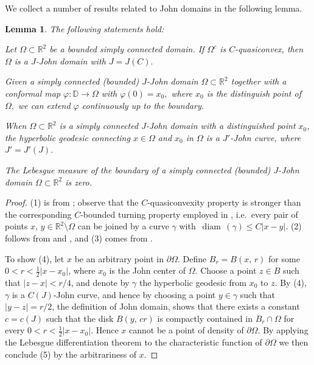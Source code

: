 \documentclass[reqno,11pt]{amsart}
\makeatletter
\def\diam{{\mathop\mathrm{\,diam\,}}}
\newtheorem{lem}[thm]{Lemma}%
\numberwithin{equation}{section}
\theoremstyle{remark}
\makeatother
\begin{document}
We collect a number of results related to John domains in the following lemma. 
\begin{lem}\label{property of John domain}
The following statements hold: 

Let $\Omega\subset \mathbb R^2$ be a bounded simply connected domain. 
If $\Omega^c$ is $C$-quasiconvex, then $\Omega$ is a $J$-John domain
with $J=J(C).$ 

Given a simply connected (bounded) $J$-John domain 
$\Omega\subset \mathbb R^2$ together with a conformal map 
$\varphi \colon \mathbb D \to \Omega$ with $\varphi(0)=x_0,$  where $x_0$ is 
the distinguish point of $\Omega,$ we can 
extend $\varphi$ 
continuously up to the boundary. 

 When $\Omega\subset \mathbb R^2$ is a simply connected $J$-John domain with a distinguished point $x_0$,  the hyperbolic geodesic connecting $x\in \Omega$ and $x_0$ in $\Omega$
is a $J'$-John curve, where $J'=J'(J).$

The Lebesgue measure of the boundary of a simply connected (bounded) $J$-John domain 
$\Omega\subset \mathbb R^2$ is zero. 
\end{lem}
\begin{proof}
(1) is from \cite[Theorem 4.5]{NV1991}; observe that the $C$-quasiconvexity property is  stronger  than the corresponding $C$-bounded turning property employed in \cite[Theorem 4.5]{NV1991}, i.e.\ every pair of points $x,\,y\in \mathbb R^2\setminus \Omega$ can be joined by a curve $\gamma$ with $\diam(\gamma)\le C |x-y|$. (2) follows from \cite[Theorem 2.18]{NV1991} and \cite[Theorem 4.7,\,Page 441]{P1991}, and (3) comes from \cite[Theorem 4.1]{GHM1989}. 

To show (4), let $x$ be an arbitrary point in $\partial\Omega$. Define $B_r=B(x,\,r)$ for some $0<r<\frac 1 2 |x-x_0|$, where $x_0$ is the John center of $\Omega$. Choose a point $z\in B$ such that $|z-x|<r/ 4 $, and denote by $\gamma$ the hyperbolic geodesic from $x_0$  to $z$. By (4), $\gamma$ is a $C(J)$-John curve, and hence by choosing a point $y\in \gamma$ such that $|y-z|=r/2$, the definition of John domain, shows that there exists a constant $c=c(J)$ such that the disk $B(y,\,cr)$ is compactly contained in $B_r\cap \Omega$ for every $0<r<\frac 1 2 |x-x_0|$. Hence $x$ cannot be a point of density of $\partial \Omega$. By applying the Lebesgue differentiation theorem to the characteristic function of $\partial \Omega$ we then conclude (5) by the arbitrariness of $x$. 
\end{proof}
\end{document}
